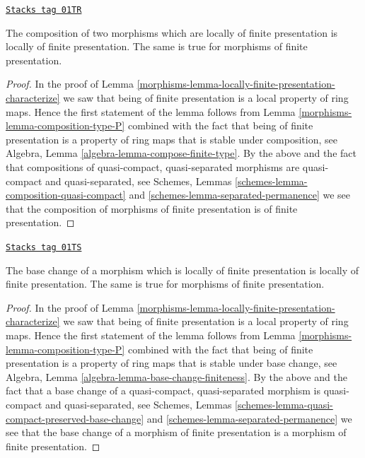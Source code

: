 \begin{lemma}
\label{morphisms-lemma-composition-finite-presentation}
\href{https://stacks.math.columbia.edu/tag/01TR}{\texttt{Stacks tag 01TR}}

The composition of two morphisms which are locally of finite presentation is
locally of finite presentation.
The same is true for morphisms of finite presentation.
\end{lemma}

\begin{proof}

In the proof of Lemma \ref{morphisms-lemma-locally-finite-presentation-characterize}
we saw that being of finite presentation is a local property of ring maps.
Hence the first statement of the lemma follows from
Lemma \ref{morphisms-lemma-composition-type-P} combined
with the fact that being of finite presentation
is a property of ring maps that is
stable under composition, see
Algebra, Lemma \ref{algebra-lemma-compose-finite-type}.
By the above and the fact that compositions of
quasi-compact, quasi-separated morphisms are
quasi-compact and quasi-separated, see
Schemes, Lemmas \ref{schemes-lemma-composition-quasi-compact}
and \ref{schemes-lemma-separated-permanence}
we see that the composition of morphisms of finite presentation is
of finite presentation.
\end{proof}

\begin{lemma}
\label{morphisms-lemma-base-change-finite-presentation}
\href{https://stacks.math.columbia.edu/tag/01TS}{\texttt{Stacks tag 01TS}}

The base change of a morphism which is locally of finite presentation
is locally of finite presentation. The same is true for morphisms of
finite presentation.
\end{lemma}

\begin{proof}

In the proof of Lemma \ref{morphisms-lemma-locally-finite-presentation-characterize}
we saw that being of finite presentation is a local property of ring maps.
Hence the first statement of the lemma follows from
Lemma \ref{morphisms-lemma-composition-type-P} combined
with the fact that being of finite presentation
is a property of ring maps that is
stable under base change, see
Algebra, Lemma \ref{algebra-lemma-base-change-finiteness}.
By the above and the fact that a base change of a
quasi-compact, quasi-separated morphism is quasi-compact
and quasi-separated, see
Schemes, Lemmas \ref{schemes-lemma-quasi-compact-preserved-base-change}
and \ref{schemes-lemma-separated-permanence}
we see that the base change of a morphism of finite presentation is
a morphism of finite presentation.
\end{proof}

